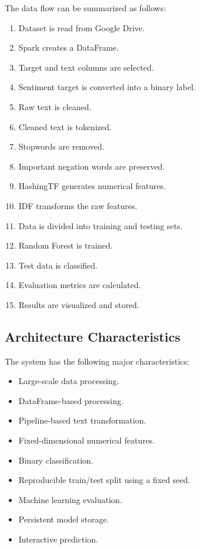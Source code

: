 \documentclass[12pt,a4paper]{article}
\begin{document}
The data flow can be summarized as follows:

\begin{enumerate}
    \item Dataset is read from Google Drive.
    \item Spark creates a DataFrame.
    \item Target and text columns are selected.
    \item Sentiment target is converted into a binary label.
    \item Raw text is cleaned.
    \item Cleaned text is tokenized.
    \item Stopwords are removed.
    \item Important negation words are preserved.
    \item HashingTF generates numerical features.
    \item IDF transforms the raw features.
    \item Data is divided into training and testing sets.
    \item Random Forest is trained.
    \item Test data is classified.
    \item Evaluation metrics are calculated.
    \item Results are visualized and stored.
\end{enumerate}



\subsection{Architecture Characteristics}

The system has the following major characteristics:

\begin{itemize}
    \item Large-scale data processing.
    \item DataFrame-based processing.
    \item Pipeline-based text transformation.
    \item Fixed-dimensional numerical features.
    \item Binary classification.
    \item Reproducible train/test split using a fixed seed.
    \item Machine learning evaluation.
    \item Persistent model storage.
    \item Interactive prediction.
\end{itemize}
\end{document}
